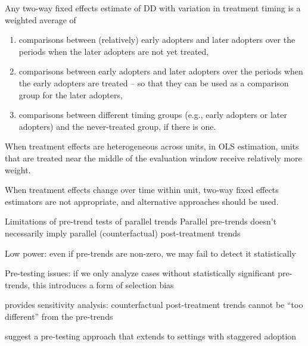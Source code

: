 \documentclass{beamer}
\begin{document}
\begin{frame}{\cite{goodman2021difference}}
Any two-way fixed effects estimate of DD with variation in treatment timing is a weighted average of 
\begin{enumerate}
	\item comparisons between (relatively) early adopters and later adopters over the periods when the later adopters are not yet treated,
	\item comparisons between early adopters and later adopters over the periods when the early adopters are treated – so that they can be used as a comparison group for the later adopters,
	\item comparisons between different timing groups (e.g., early adopters or later adopters) and the never-treated group, if there is one. 
\end{enumerate}
When treatment effects are heterogeneous across units, in OLS estimation, units that are treated near the middle of the evaluation window receive relatively more weight.\medskip 

When treatment effects change over time within unit, two-way fixed effects estimators are not appropriate, and alternative approaches should be used. 
\end{frame}

\begin{frame}{Limitations of pre-trend tests of parallel trends}
	Parallel pre-trends doesn't necessarily imply parallel (counterfactual) post-treatment
	trends\bigskip
	
	Low power: even if pre-trends are non-zero, we may fail to detect it statistically\bigskip
	
	Pre-testing issues: if we only analyze cases without statistically significant pre-trends,	this introduces a form of selection bias %
	\bigskip
	
	\cite{rambachan2023more} provides sensitivity analysis: counterfactual post-treatment trends cannot be ``too different'' from the pre-trends\bigskip
	
	\cite{callaway2021difference} suggest a pre-testing approach that extends to settings with staggered adoption
	
	
	
\end{frame}
\end{document}
